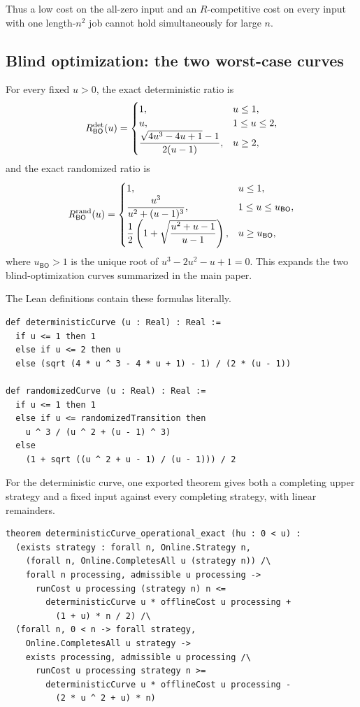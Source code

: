 Thus a low cost on the all-zero input and an $R$-competitive cost on every
input with one length-$n^2$ job cannot hold simultaneously for large $n$.

\subsection{Blind optimization: the two worst-case curves}

\begin{theorem}
\label{thm:lean-audit-blind-optimization-curves}
For every fixed $u>0$, the exact deterministic ratio is
\[
 R_{\mathsf{BO}}^{\mathrm{det}}(u)=
 \begin{cases}
  1,&u\le1,\\
  u,&1\le u\le2,\\
  \dfrac{\sqrt{4u^3-4u+1}-1}{2(u-1)},&u\ge2,
 \end{cases}
\]
and the exact randomized ratio is
\[
 R_{\mathsf{BO}}^{\mathrm{rand}}(u)=
 \begin{cases}
  1,&u\le1,\\
  \dfrac{u^3}{u^2+(u-1)^3},&1\le u\le u_{\mathsf{BO}},\\
  \dfrac12\left(1+\sqrt{\dfrac{u^2+u-1}{u-1}}\right),
     &u\ge u_{\mathsf{BO}},
 \end{cases}
\]
where $u_{\mathsf{BO}}>1$ is the unique root of
$u^3-2u^2-u+1=0$.  This expands the two blind-optimization curves summarized
in the main paper.
\end{theorem}

The Lean definitions contain these formulas literally.

\begin{lstlisting}[style=lean]
def deterministicCurve (u : Real) : Real :=
  if u <= 1 then 1
  else if u <= 2 then u
  else (sqrt (4 * u ^ 3 - 4 * u + 1) - 1) / (2 * (u - 1))

def randomizedCurve (u : Real) : Real :=
  if u <= 1 then 1
  else if u <= randomizedTransition then
    u ^ 3 / (u ^ 2 + (u - 1) ^ 3)
  else
    (1 + sqrt ((u ^ 2 + u - 1) / (u - 1))) / 2
\end{lstlisting}

For the deterministic curve, one exported theorem gives both a completing
upper strategy and a fixed input against every completing strategy, with
linear remainders.

\begin{lstlisting}[style=lean]
theorem deterministicCurve_operational_exact (hu : 0 < u) :
  (exists strategy : forall n, Online.Strategy n,
    (forall n, Online.CompletesAll u (strategy n)) /\
    forall n processing, admissible u processing ->
      runCost u processing (strategy n) n <=
        deterministicCurve u * offlineCost u processing +
          (1 + u) * n / 2) /\
  (forall n, 0 < n -> forall strategy,
    Online.CompletesAll u strategy ->
    exists processing, admissible u processing /\
      runCost u processing strategy n >=
        deterministicCurve u * offlineCost u processing -
          (2 * u ^ 2 + u) * n)
\end{lstlisting}

